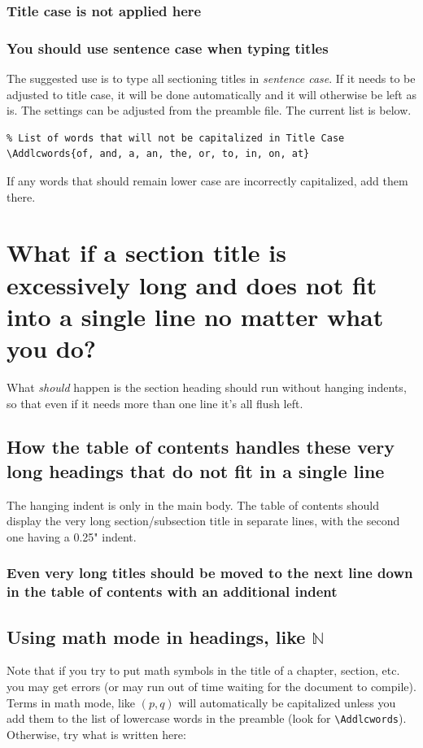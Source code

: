 \subsubsection{Title case is not applied here}
\subsubsection{You should use sentence case when typing titles}

The suggested use is to type all sectioning titles in {\em sentence case}. If it needs to be adjusted to title case, it will be done automatically and it will otherwise be left as is. The settings can be adjusted from the preamble file. The current list is below.
\begin{lstlisting}
% List of words that will not be capitalized in Title Case
\Addlcwords{of, and, a, an, the, or, to, in, on, at}
\end{lstlisting}
If any words that should remain lower case are incorrectly capitalized, add them there.

\section{What if a section title is excessively long and does not fit into a single line no matter what you do?}
What \textit{should} happen is the section heading should run without hanging indents, so that even if it needs more than one line it's all flush left.
\subsection{How the table of contents handles these very long headings that do not fit in a single line}
The hanging indent is only in the main body. The table of contents should display the very long section/subsection title in separate lines, with the second one having a 0.25" indent. 
\subsubsection{Even very long titles should be moved to the next line down in the table of contents with an additional indent}
\subsection{Using math mode in headings, like  \texorpdfstring{$\mathbb{N}$}{N}}
Note that if you try to put math symbols in the title of a chapter, section, etc. you may get errors (or may run out of time waiting for the document to compile). Terms in math mode, like $(p,q)$ will automatically be capitalized unless you add them to the list of lowercase words in the preamble (look for \verb|\Addlcwords|). Otherwise, try what is written here:

